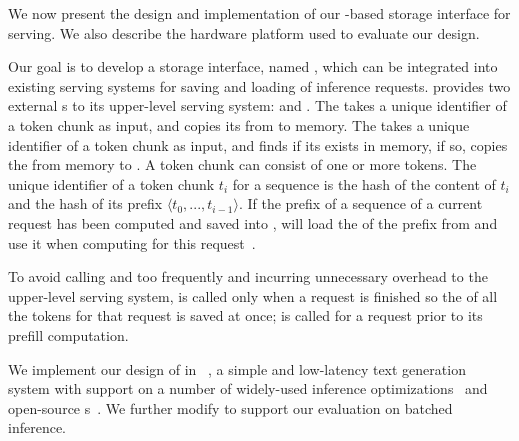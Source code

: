 We now present the design and implementation of our \cxl-based \kvcache storage interface for \llm serving. We also describe the hardware platform used to evaluate our design.

 Our goal is to develop a \cxl storage interface, named \tool, which can be integrated into existing \llm serving systems for saving and loading \kvcache of inference requests.
\tool provides two external \api{}s to its upper-level serving system: \apisave and \apiload. 
The \apisave takes a unique identifier of a token chunk as input, and copies its \kvcache from \gpu to \cxl memory. 
The \apiload takes a unique identifier of a token chunk as input, and finds if its  \kvcache exists in \cxl memory, if so, copies the \kvcache from \cxl memory to \gpu. A token chunk can consist of one or more tokens.
The unique identifier of a token chunk $t_i$ for a sequence is the hash of the content of $t_i$ and the hash of its prefix $\langle t_0,...,t_{i-1}\rangle$. If the prefix of a sequence of a current request has been computed and saved into \cxl, \tool will load the \kvcache of the prefix from \cxl and use it when computing for this request~\cite{pagedattenion}. 

To avoid calling \apisave and \apiload too frequently and incurring unnecessary overhead to the upper-level serving system, \apisave is called only when a request is finished so the \kvcache of all the tokens for that request is saved at once; \apiload is called for a request prior to its prefill computation. 

We implement our design of \tool in \gptfast~\cite{gpt-fast}, a simple and low-latency text generation system with support on a number of widely-used inference optimizations~\cite{leviathan2023fast,narayanan2021efficient,jacob2018quantization} and open-source \llm{}s~\cite{llama2,jiang2023mistral}. 
We further modify \gptfast to support our evaluation on batched inference.

